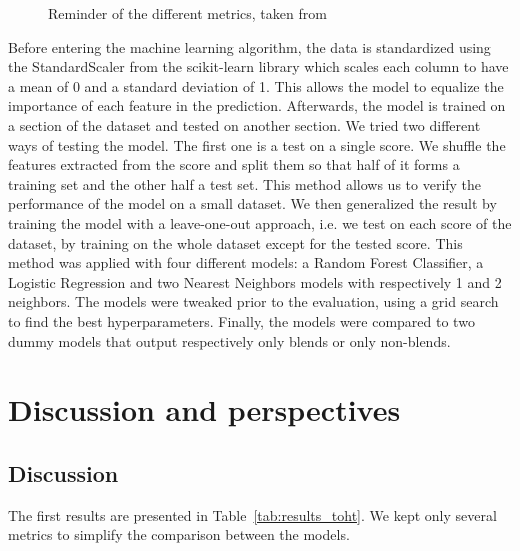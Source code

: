 \documentclass{article}
\begin{document}
\begin{figure}[ht]
  \centerline{}
  \caption{Reminder of the different metrics, taken from \cite{acc_fig}}
  \label{fig:metrics}
\end{figure}


Before entering the machine learning algorithm, the data is standardized using the StandardScaler from the scikit-learn library which scales each column to have a mean of 0 and a standard deviation of 1.
This allows the model to equalize the importance of each feature in the prediction.
Afterwards, the model is trained on a section of the dataset and tested on another section.
We tried two different ways of testing the model.
The first one is a test on a single score. We shuffle the features extracted from the score and split them so that half of it forms a training set and the other half a test set.
This method allows us to verify the performance of the model on a small dataset.
We then generalized the result by training the model with a leave-one-out approach, i.e. we test on each score of the dataset, by training on the whole dataset except for the tested score.
This method was applied with four different models: a Random Forest Classifier, a Logistic Regression and two Nearest Neighbors models with respectively 1 and 2 neighbors.
The models were tweaked prior to the evaluation, using a grid search to find the best hyperparameters.
Finally, the models were compared to two dummy models that output respectively only blends or only non-blends.


\section{Discussion and perspectives}\label{sec:discussion}

\subsection{Discussion}

The first results are presented in Table~\ref{tab:results_toht}. We kept only several metrics to simplify the comparison between the models.
\end{document}
